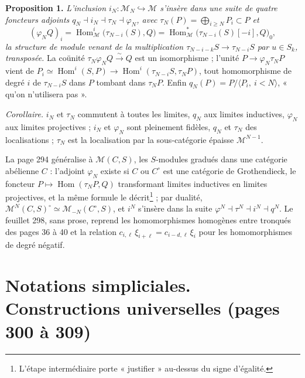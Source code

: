 \documentclass[11pt,a4paper]{article}
\begin{document}
\textbf{Proposition 1.} \emph{L'inclusion $i_N : \mathcal{M}_N \hookrightarrow
\mathcal{M}$ s'insère dans une suite de quatre foncteurs adjoints $q_N \dashv
i_N \dashv \tau_N \dashv \varphi_N$, avec $\tau_N(P) = \bigoplus_{i \geq N}P_i
\subset P$ et}
\[
(\varphi_N Q)_i = \operatorname{Hom}^i_{\mathcal{M}}\bigl(\tau_{N-i}(S), Q\bigr) = \operatorname{Hom}^*_{\mathcal{M}}\bigl(\tau_{N-i}(S)[-i], Q\bigr)_0 ,
\]
\emph{la structure de module venant de la multiplication $\tau_{N-i-k}S \to
\tau_{N-i}S$ par $u \in S_k$, transposée.} La coünité $\tau_N\varphi_N Q
\xrightarrow{\sim} Q$ est un isomorphisme ; l'unité $P \to \varphi_N\tau_NP$
vient de $P_i \simeq \operatorname{Hom}^i(S, P) \to \operatorname{Hom}^i(\tau_{N-i}S,
\tau_NP)$, tout homomorphisme de degré $i$ de $\tau_{N-i}S$ dans $P$ tombant dans
$\tau_NP$. Enfin $q_N(P) = P/\langle P_i,\ i < N\rangle$, « qu'on n'utilisera
pas ».

\emph{Corollaire.} $i_N$ et $\tau_N$ commutent à toutes les limites, $q_N$ aux
limites inductives, $\varphi_N$ aux limites projectives ; $i_N$ et $\varphi_N$
sont pleinement fidèles, $q_N$ et $\tau_N$ des localisations ; $\tau_N$ est la
localisation par la sous-catégorie épaisse $\mathcal{M}^{N-1}$.

La page 294 généralise à $\mathcal{M}(C,S)$, les $S$-modules gradués dans une
catégorie abélienne $C$ : l'adjoint $\varphi_N$ existe si $C$ ou $C^\circ$ est
une catégorie de Grothendieck, le foncteur $P \mapsto
\operatorname{Hom}(\tau_NP, Q)$ transformant limites inductives en limites
projectives, et la même formule le décrit\footnote{L'étape intermédiaire porte
« justifier » au-dessus du signe d'égalité.} ; par dualité, $\mathcal{M}^N(C,S)^\circ
\simeq \mathcal{M}_{-N}(C^\circ, S)$, et $i^N$ s'insère dans la suite
$\varphi^N \dashv \tau^N \dashv i^N \dashv q^N$. Le feuillet 298, sans prose,
reprend les homomorphismes homogènes entre tronqués des pages 36 à 40 et la
relation $c_{i,\ell}\,\xi_{i+\ell} = c_{i-d,\ell}\,\xi_i$ pour les homomorphismes
de degré négatif.

\section*{Notations simpliciales. Constructions universelles (pages 300 à 309)}
\end{document}
